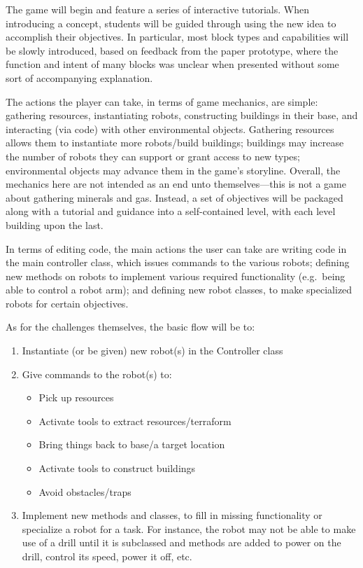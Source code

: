 \documentclass[12pt,notitlepage]{article}
\begin{document}
The game will begin and feature a series of interactive
tutorials. When introducing a concept, students will be guided through
using the new idea to accomplish their objectives. In particular, most
block types and capabilities will be slowly introduced, based on
feedback from the paper prototype, where the function and intent of
many blocks was unclear when presented without some sort of
accompanying explanation.

The actions the player can take, in terms of game mechanics, are
simple: gathering resources, instantiating robots, constructing
buildings in their base, and interacting (via code) with other
environmental objects. Gathering resources allows them to instantiate
more robots/build buildings; buildings may increase the number of
robots they can support or grant access to new types; environmental
objects may advance them in the game's storyline. Overall, the
mechanics here are not intended as an end unto themselves---this is
not a game about gathering minerals and gas. Instead, a set of
objectives will be packaged along with a tutorial and guidance into a
self-contained level, with each level building upon the last.

In terms of editing code, the main actions the user can take are
writing code in the main controller class, which issues commands to
the various robots; defining new methods on robots to implement
various required functionality (e.g.\ being able to control a robot
arm); and defining new robot classes, to make specialized robots for
certain objectives.

As for the challenges themselves, the basic flow will be to:

\begin{enumerate}
\item Instantiate (or be given) new robot(s) in the Controller class
\item Give commands to the robot(s) to:
  \begin{itemize}
  \item Pick up resources
  \item Activate tools to extract resources/terraform
  \item Bring things back to base/a target location
  \item Activate tools to construct buildings
  \item Avoid obstacles/traps
  \end{itemize}
\item Implement new methods and classes, to fill in missing
  functionality or specialize a robot for a task. For instance, the
  robot may not be able to make use of a drill until it is subclassed
  and methods are added to power on the drill, control its speed,
  power it off, etc.
\end{enumerate}
\end{document}
